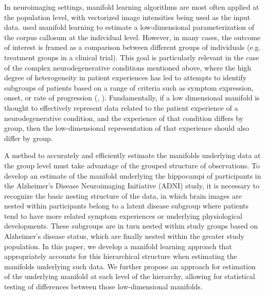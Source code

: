 \documentclass[11pt,reqno]{article}
\theoremstyle{definition}
\begin{document}
In neuroimaging settings, manifold learning algorithms are most often applied at the population level, with vectorized image intensities being used as the input data. \cite{yueParameterizationWhiteMatter2016} used manifold learning to estimate a low-dimensional parameterization of the corpus callosum at the individual level. However, in many cases, the outcome of interest is framed as a comparison between different groups of individuals (e.g. treatment groups in a clinical trial). This goal is particularly relevant in the case of the complex neurodegenerative conditions mentioned above, where the high degree of heterogeneity in patient experiences has led to attempts to identify subgroups of patients based on a range of criteria such as symptom expression, onset, or rate of progression (\cite{ferreiraBiologicalSubtypesAlzheimer2020}, \cite{venutoPredictingAmbulatoryCapacity}). Fundamentally, if a low dimensional manifold is thought to effectively represent data related to the patient experience of a neurodegenerative condition, and the experience of that condition differs by group, then the low-dimensional representation of that experience should also differ by group.

A method to accurately and efficiently estimate the manifolds underlying data at the group level must take advantage of the grouped structure of observations. To develop an estimate of the manifold underlying the hippocampi of participants in the Alzheimer's Disease Neuroimaging Initiative (ADNI) study, it is necessary to recognize the basic nesting structure of the data, in which brain images are nested within participants belong to a latent disease subgroup where patients tend to have more related symptom experiences or underlying physiological developments. These subgroups are in turn nested within study groups based on Alzheimer's disease status, which are finally nested within the greater study population. In this paper, we develop a manifold learning approach that appropriately accounts for this hierarchical structure when estimating the manifolds underlying such data. We further propose an approach for estimation of the underlying manifold at each level of the hierarchy, allowing for statistical testing of differences between those low-dimensional manifolds.
\end{document}
